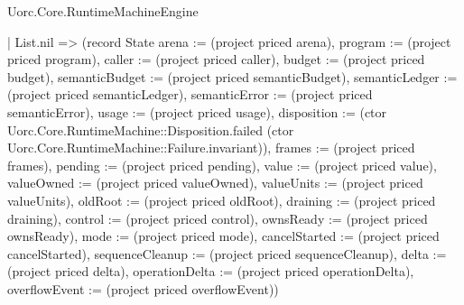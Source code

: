 \begin{lexlean}{Uorc.Core.RuntimeMachineEngine}
\begin{semanticmodule}
{      | List.nil => (record State {arena := (project priced arena), program := (project priced program), caller := (project priced caller), budget := (project priced budget), semanticBudget := (project priced semanticBudget), semanticLedger := (project priced semanticLedger), semanticError := (project priced semanticError), usage := (project priced usage), disposition := (ctor Uorc.Core.RuntimeMachine::Disposition.failed (ctor Uorc.Core.RuntimeMachine::Failure.invariant)), frames := (project priced frames), pending := (project priced pending), value := (project priced value), valueOwned := (project priced valueOwned), valueUnits := (project priced valueUnits), oldRoot := (project priced oldRoot), draining := (project priced draining), control := (project priced control), ownsReady := (project priced ownsReady), mode := (project priced mode), cancelStarted := (project priced cancelStarted), sequenceCleanup := (project priced sequenceCleanup), delta := (project priced delta), operationDelta := (project priced operationDelta), overflowEvent := (project priced overflowEvent)})
}
\end{semanticmodule}
\end{lexlean}
